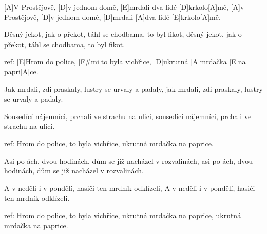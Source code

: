 
[A]V Prostějově, [D]v jednom domě,
[E]mrdali dva lidé [D]krkolo[A]mě,
[A]v Prostějově, [D]v jednom domě,
[D]mrdali [A]dva lidé [E]krkolo[A]mě.

Děsný jekot, jak o překot,
táhl se chodbama, to byl fikot,
děsný jekot, jak o překot,
táhl se chodbama, to byl fikot.

ref:
[E]Hrom do police, [F#mi]to byla vichřice,
[D]ukrutná [A]mrdačka [E]na papri[A]ce.

Jak mrdali, zdi praskaly,
lustry se urvaly a padaly,
jak mrdali, zdi praskaly,
lustry se urvaly a padaly.

Sousedící nájemníci,
prchali ve strachu na ulici,
sousedící nájemníci,
prchali ve strachu na ulici.

ref:
Hrom do police, to byla vichřice,
ukrutná mrdačka na paprice.

Asi po ách, dvou hodinách,
dům se již nacházel v rozvalinách,
asi po ách, dvou hodinách,
dům se již nacházel v rozvalinách.

A v neděli i v pondělí,
hasiči ten mrdník odklízeli,
A v neděli i v pondělí,
hasiči ten mrdník odklízeli.

ref:
Hrom do police, to byla vichřice,
ukrutná mrdačka na paprice,
ukrutná mrdačka na paprice.
